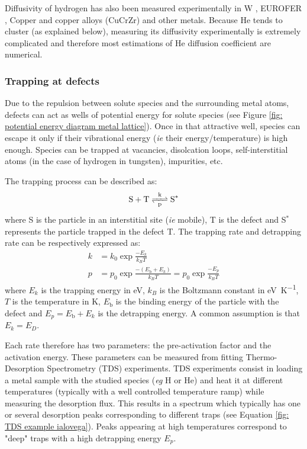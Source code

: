 Diffusivity of hydrogen has also been measured experimentally in W , EUROFER , Copper and copper alloys (CuCrZr)  and other metals.
Because He tends to cluster (as explained below), measuring its diffusivity experimentally is extremely complicated and therefore most estimations of He diffusion coefficient are numerical.

\subsubsection{Trapping at defects}

Due to the repulsion between solute species and the surrounding metal atoms, defects can act as wells of potential energy for solute species (see Figure \ref{fig: potential energy diagram metal lattice}).
Once in that attractive well, species can escape it only if their vibrational energy (\textit{ie} their energy/temperature) is high enough.
Species can be trapped at vacancies, disolcation loops, self-interstitial atoms (in the case of hydrogen in tungsten), impurities, etc.

The trapping process can be described as:
\begin{equation}
    \ce{S + T <=>[k][p] S^*}
\end{equation}
where S is the particle in an interstitial site (\textit{ie} mobile), T is the defect and S$^*$ represents the particle trapped in the defect T.
The trapping rate and detrapping rate can be respectively expressed as:
\begin{align}
    k &= k_0 \exp{\frac{-E_k}{k_B T}} \\
    p &= p_0 \exp{\frac{-(E_\mathrm{b} + E_k)}{k_B T}} = p_0 \exp{\frac{-E_p}{k_B T}}
\end{align}
where $E_k$ is the trapping energy in \si{eV}, $k_B$ is the Boltzmann constant in \si{eV.K^{-1}}, $T$ is the temperature in \si{K}, $E_\mathrm{b}$ is the binding energy of the particle with the defect and $E_p = E_\mathrm{b} + E_k$ is the detrapping energy.
A common assumption is that $E_k = E_D$.

Each rate therefore has two parameters: the pre-activation factor and the activation energy.
These parameters can be measured from fitting Thermo-Desorption Spectrometry (TDS) experiments.
TDS experiments consist in loading a metal sample with the studied species (\textit{eg} H or He) and heat it at different temperatures (typically with a well controlled temperature ramp) while measuring the desorption flux.
This results in a spectrum which typically has one or several desorption peaks corresponding to different traps (see Equation \ref{fig: TDS example ialovega}).
Peaks appearing at high temperatures correspond to "deep" traps with a high detrapping energy $E_p$.

